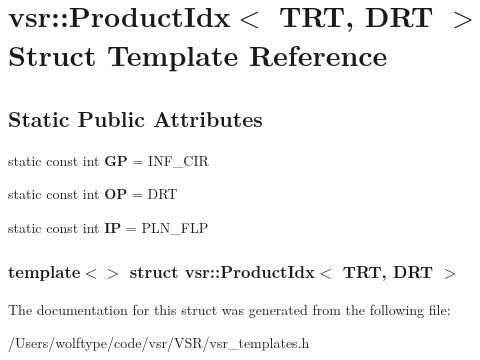 \hypertarget{structvsr_1_1_product_idx_3_01_t_r_t_00_01_d_r_t_01_4}{\section{vsr\-:\-:Product\-Idx$<$ T\-R\-T, D\-R\-T $>$ Struct Template Reference}
\label{structvsr_1_1_product_idx_3_01_t_r_t_00_01_d_r_t_01_4}
}
\subsection*{Static Public Attributes}
\begin{DoxyCompactItemize}
\item 
\hypertarget{structvsr_1_1_product_idx_3_01_t_r_t_00_01_d_r_t_01_4_ad4b1425c1cc1a19d52b82635d53d40a2}{static const int {\bfseries G\-P} = I\-N\-F\-\_\-\-C\-I\-R}\label{structvsr_1_1_product_idx_3_01_t_r_t_00_01_d_r_t_01_4_ad4b1425c1cc1a19d52b82635d53d40a2}

\item 
\hypertarget{structvsr_1_1_product_idx_3_01_t_r_t_00_01_d_r_t_01_4_ab37c97d2dd40da5b6c1a5a7d36a21b3d}{static const int {\bfseries O\-P} = D\-R\-T}\label{structvsr_1_1_product_idx_3_01_t_r_t_00_01_d_r_t_01_4_ab37c97d2dd40da5b6c1a5a7d36a21b3d}

\item 
\hypertarget{structvsr_1_1_product_idx_3_01_t_r_t_00_01_d_r_t_01_4_ab03fede71b5db052612a619178843360}{static const int {\bfseries I\-P} = P\-L\-N\-\_\-\-F\-L\-P}\label{structvsr_1_1_product_idx_3_01_t_r_t_00_01_d_r_t_01_4_ab03fede71b5db052612a619178843360}

\end{DoxyCompactItemize}
\subsubsection*{template$<$$>$ struct vsr\-::\-Product\-Idx$<$ T\-R\-T, D\-R\-T $>$}



The documentation for this struct was generated from the following file\-:\begin{DoxyCompactItemize}
\item 
/\-Users/wolftype/code/vsr/\-V\-S\-R/vsr\-\_\-templates.\-h\end{DoxyCompactItemize}
